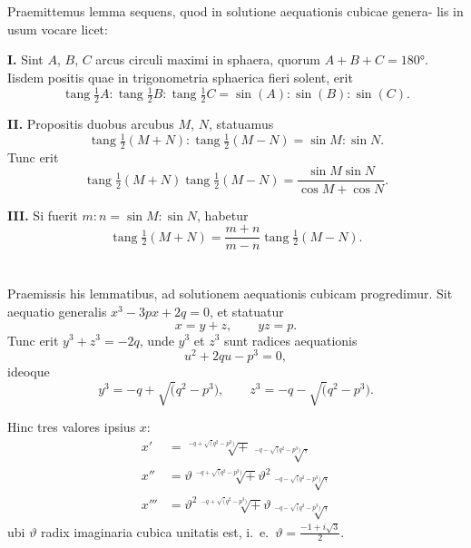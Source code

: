 \documentclass[12pt,a4paper]{article}
\newcommand{\tang}{\mathop{\mathrm{tang}}\nolimits}
\begin{document}
\section{}

Praemittemus lemma sequens, quod in solutione aequationis cubicae genera-
lis in usum vocare licet:

\textbf{I.} Sint $A$, $B$, $C$ arcus circuli maximi in sphaera, quorum $A + B + C = 180°$.
Iisdem positis quae in trigonometria sphaerica fieri solent, erit
\[
\tang\tfrac{1}{2}A : \tang\tfrac{1}{2}B : \tang\tfrac{1}{2}C = \sin(A) : \sin(B) : \sin(C).
\]

\textbf{II.} Propositis duobus arcubus $M$, $N$, statuamus
\[
\tang\tfrac{1}{2}(M + N) : \tang\tfrac{1}{2}(M - N) = \sin M : \sin N.
\]
Tunc erit
\[
\tang\tfrac{1}{2}(M + N)\tang\tfrac{1}{2}(M - N) = \frac{\sin M\sin N}{\cos M + \cos N}.
\]

\textbf{III.} Si fuerit $m : n = \sin M : \sin N$, habetur
\[
\tang\tfrac{1}{2}(M + N) = \frac{m + n}{m - n}\tang\tfrac{1}{2}(M - N).
\]

\section{}

Praemissis his lemmatibus, ad solutionem aequationis cubicam progredimur.
Sit aequatio generalis $x^3 - 3px + 2q = 0$, et statuatur
\[
x = y + z, \qquad yz = p.
\]
Tunc erit $y^3 + z^3 = -2q$, unde $y^3$ et $z^3$ sunt radices aequationis
\[
u^2 + 2qu - p^3 = 0,
\]
ideoque
\[
y^3 = -q + \surd(q^2 - p^3), \qquad z^3 = -q - \surd(q^2 - p^3).
\]

Hinc tres valores ipsius $x$:
\begin{align*}
x' &= \surd[-q + \surd(q^2 - p^3)] + \surd[-q - \surd(q^2 - p^3)], \\
x'' &= \vartheta\surd[-q + \surd(q^2 - p^3)] + \vartheta^2\surd[-q - \surd(q^2 - p^3)], \\
x''' &= \vartheta^2\surd[-q + \surd(q^2 - p^3)] + \vartheta\surd[-q - \surd(q^2 - p^3)],
\end{align*}
ubi $\vartheta$ radix imaginaria cubica unitatis est, i.~e.~$\vartheta = \frac{-1 + i\surd 3}{2}$.
\end{document}
